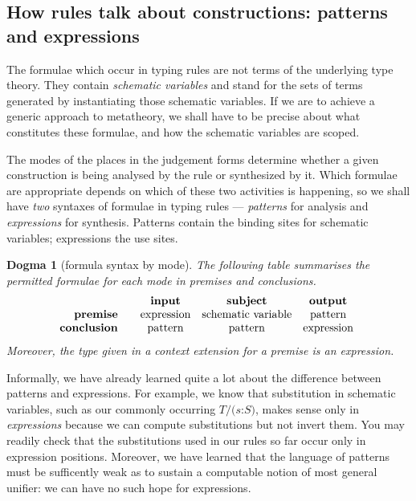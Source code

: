\documentclass{jfp1}
\newtheorem{dogma}[theorem]{Dogma}
\newcommand{\fsl}{\texttt{/}}
\newcommand{\Pa}[1]{\texttt{(}#1\texttt{)}}
\newcommand{\hb}{\texttt{:}}
\newcommand{\ra}[2]{\Pa{#1 \hb #2}}
\begin{document}
\subsection{How rules talk about constructions: patterns and expressions}

The formulae which occur in typing rules are not terms of the underlying
type theory. They contain \emph{schematic variables} and stand for the sets
of terms generated by instantiating those schematic variables. If we are
to achieve a generic approach to metatheory, we shall have to be precise
about what constitutes these formulae, and how the schematic variables are
scoped.

The modes of the places in the judgement forms determine whether a given
construction is being analysed by the rule or synthesized by it. Which formulae
are appropriate depends on which of these two activities is happening, so
we shall have \emph{two} syntaxes of formulae in typing rules --- \emph{patterns}
for analysis and \emph{expressions} for synthesis. Patterns contain the
binding sites for schematic variables; expressions the use sites.

\begin{dogma}[\label{dogma:mode}formula syntax by mode]
  The following table summarises the permitted formulae for each mode in premises
  and conclusions.
  \[\mbox{\begin{tabular}{r@{~ ~}@{~ ~}c@{~ ~}c@{~ ~}c}
                    & \textbf{input} & \textbf{subject} & \textbf{output} \\
            \textbf{premise}  & expression & schematic variable & pattern \\
     \textbf{conclusion} & pattern & pattern & expression \\
          \end{tabular} }\]
  Moreover, the type given in a context extension for a premise is an expression.
\end{dogma}

Informally, we have already learned quite a lot about the difference
between patterns and expressions. For example, we know that
substitution in schematic variables, such as our commonly occurring
$T\fsl\ra sS$, makes sense only in \emph{expressions} because we
can compute substitutions but not invert them. You may readily check
that the substitutions used in our rules so far occur only in
expression positions. Moreover, we have learned that the language of
patterns must be sufficently weak as to sustain a computable notion of
most general unifier: we can have no such hope for expressions.
\end{document}
